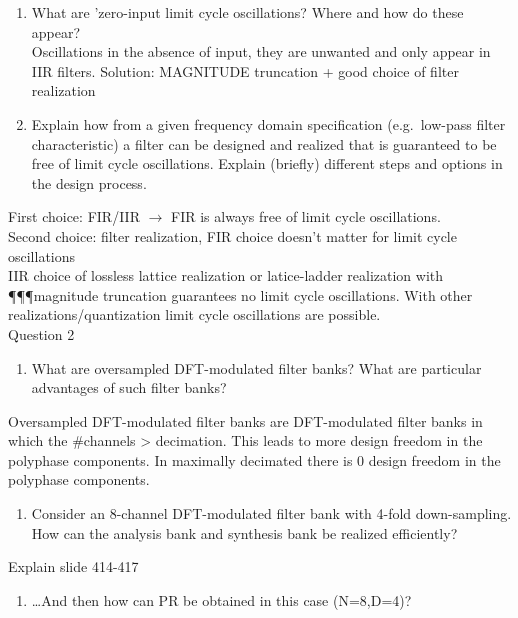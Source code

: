 \documentclass[
  a4paper,
  ,captions=tableheading
]{scrartcl}
\providecommand{\tightlist}{%
  \setlength{\itemsep}{0pt}\setlength{\parskip}{0pt}}
\begin{document}
\begin{enumerate}
\def\labelenumi{\arabic{enumi}.}
\tightlist
\item
  What are 'zero-input limit cycle oscillations? Where and how do these
  appear?\\
  Oscillations in the absence of input, they are unwanted and only
  appear in IIR filters. Solution: MAGNITUDE truncation + good choice of
  filter realization\\
\item
  Explain how from a given frequency domain specification (e.g.~low-pass
  filter characteristic) a filter can be designed and realized that is
  guaranteed to be free of limit cycle oscillations. Explain (briefly)
  different steps and options in the design process.
\end{enumerate}

First choice: FIR/IIR \(\rightarrow\) FIR is always free of limit cycle
oscillations.\\
Second choice: filter realization, FIR choice doesn't matter for limit
cycle oscillations\\
IIR choice of lossless lattice realization or latice-ladder realization
with ¶¶¶magnitude truncation guarantees no limit cycle oscillations.
With other realizations/quantization limit cycle oscillations are
possible.\\
Question 2

\begin{enumerate}
\def\labelenumi{\arabic{enumi}.}
\tightlist
\item
  What are oversampled DFT-modulated filter banks? What are particular
  advantages of such filter banks?
\end{enumerate}

Oversampled DFT-modulated filter banks are DFT-modulated filter banks in
which the \#channels \textgreater{} decimation. This leads to more
design freedom in the polyphase components. In maximally decimated there
is 0 design freedom in the polyphase components.

\begin{enumerate}
\def\labelenumi{\arabic{enumi}.}
\setcounter{enumi}{1}
\tightlist
\item
  Consider an 8-channel DFT-modulated filter bank with 4-fold
  down-sampling. How can the analysis bank and synthesis bank be
  realized efficiently?
\end{enumerate}

Explain slide 414-417

\begin{enumerate}
\def\labelenumi{\arabic{enumi}.}
\setcounter{enumi}{2}
\tightlist
\item
  \ldots And then how can PR be obtained in this case (N=8,D=4)?
\end{enumerate}
\end{document}
